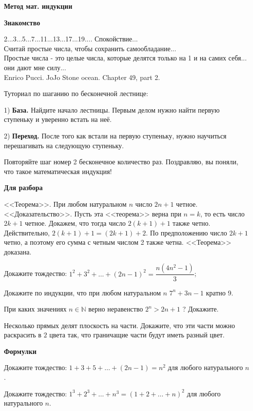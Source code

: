 \centerline{\bf \Huge Метод мат. индукции}
\centerline{\bf \Huge Знакомство}

\begin{flushright}
        \scriptsize{2...3...5...7...11...13...17...19.... Спокойствие...\\ Считай простые числа, чтобы сохранить самообладание...\\ Простые числа - это целые числа, которые делятся только на 1 и на самих себя...\\ они дают мне силу...\\Enrico Pucci. JoJo Stone ocean. Chapter 49, part 2.}
\end{flushright}

Туториал по шаганию по бесконечной лестнице:

1) \textbf{База.} Найдите начало лестницы. Первым делом нужно найти первую ступеньку и уверенно встать на неё.

2) \textbf{Переход.} После того как встали на первую ступеньку, нужно научиться перешагивать на следующую ступеньку. 

Повторяйте шаг номер 2 бесконечное количество раз. Поздравляю, вы поняли, что такое математическая индукция!

\centerline{\bf \large Для разбора}

<<Теорема>>. При любом натуральном $n$ число $2 n+1$ четное.
<<Доказательство>>. Пусть эта <<теорема>> верна при $n=k$, то есть число $2 k+1$ четное. Докажем, что тогда число $2(k+1)+1$ также четно. Действительно, $2(k+1)+1=(2 k+1)+2$. По предположению число $2 k+1$ четно, а поэтому его сумма с четным числом 2 также четна. <<Теорема>> доказана.

Докажите тождество: $1^2+3^2+\ldots+(2 n-1)^2=\dfrac{n\left(4 n^2-1\right)}{3}$;


Докажите по индукции, что при любом натуральном $n$ $7^n+3 n-1$ кратно 9.

При каких значениях $n \in \mathbb{N}$ верно неравенство $2^n>2 n+1$ ? Докажите.

Несколько прямых делят плоскость на части. Докажите, что эти части можно раскрасить в $2$ цвета так, что граничащие части будут иметь разный цвет.

\centerline{\bf \large Формулки}

Докажите тождество: $1+3+5+\ldots+(2 n-1)=n^2$ для любого натурального $n$.

Докажите тождество: $1^3+2^3+\ldots+n^3=(1+2+\ldots+n)^2$ для любого натурального $n$.

